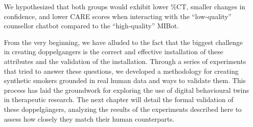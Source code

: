 We hypothesized that both groups would exhibit lower \%CT, smaller changes in confidence, and lower CARE scores when interacting with the ``low-quality'' counsellor chatbot compared to the ``high-quality'' MIBot.

From the very beginning, we have alluded to the fact that the biggest challenge in creating doppelgangers is the correct and effective installation of these attributes and the validation of the installation. Through a series of experiments that tried to answer these questions, we developed a methodology for creating synthetic smokers grounded in real human data and ways to validate them. This process has laid the groundwork for exploring the use of digital behavioural twins in therapeutic research. The next chapter will detail the formal validation of these doppelgängers, analyzing the results of the experiments described here to assess how closely they match their human counterparts.

